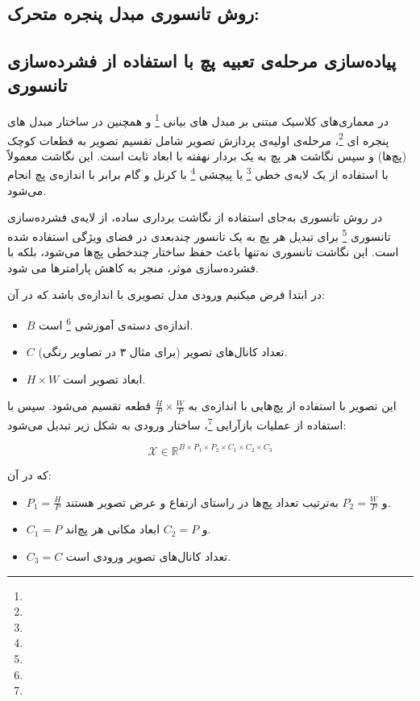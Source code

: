 \subsection{روش تانسوری مبدل پنجره متحرک:}




\subsection{پیاده‌سازی مرحله‌ی  تعبیه پچ
	با استفاده از فشرده‌سازی تانسوری}

در معماری‌های کلاسیک مبتنی بر مبدل های بیانی \footnote{}  و همچنین در ساختار مبدل های پنجره ای \footnote{}، مرحله‌ی اولیه‌ی پردازش تصویر شامل تقسیم تصویر به قطعات کوچک (پچ‌ها) و سپس نگاشت هر پچ به یک بردار نهفته با ابعاد ثابت است. این نگاشت معمولاً با استفاده از یک لایه‌ی خطی \footnote{} یا پیچشی \footnote{} با کرنل و گام برابر با اندازه‌ی پچ انجام می‌شود.

در روش تانسوری به‌جای استفاده از نگاشت برداری ساده، از لایه‌ی فشرده‌سازی تانسوری \footnote{} برای تبدیل هر پچ به یک تانسور چندبعدی در فضای ویژگی استفاده شده است. این نگاشت تانسوری نه‌تنها باعث حفظ ساختار چندخطی پچ‌ها می‌شود، بلکه با فشرده‌سازی موثر، منجر به کاهش پارامترها می شود.




در ابتدا فرض میکنیم  ورودی مدل تصویری با اندازه‌ی  باشد که در آن:

\begin{itemize}
	\item $B$ اندازه‌ی دسته‌ی آموزشی \footnote{} است.
	\item $C$ تعداد کانال‌های تصویر (برای مثال ۳ در تصاویر رنگی).
	\item $H \times W$ ابعاد تصویر است.
\end{itemize}

این تصویر با استفاده از پچ‌هایی با اندازه‌ی  به $\frac{H}{P} \times \frac{W}{P}$ قطعه تقسیم می‌شود. سپس با استفاده از عملیات بازآرایی \footnote{}، ساختار ورودی به شکل زیر تبدیل می‌شود:

\[
\mathcal{X} \in \mathbb{R}^{B \times P_1 \times P_2 \times C_1 \times C_2 \times C_3}
\]

که در آن:

\begin{itemize}
	\item $P_1 = \frac{H}{P}$ و $P_2 = \frac{W}{P}$ به‌ترتیب تعداد پچ‌ها در راستای ارتفاع و عرض تصویر هستند.
	\item $C_1 = P$ و $C_2 = P$ ابعاد مکانی هر پچ‌اند.
	\item $C_3 = C$ تعداد کانال‌های تصویر ورودی است.
\end{itemize}

